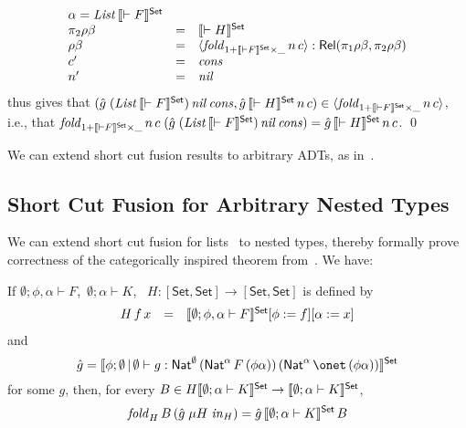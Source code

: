 \documentclass{lmcs}
\theoremstyle{plain}\newtheorem{satz}[thm]{Satz}
\newcommand{\set}{\mathsf{Set}}
\begin{document}
{\[\begin{array}{lll}
{  \alpha}=\mathit{List}\,\setsem{\vdash F}\\
\pi_2 \rho \beta & = & \setsem{\vdash H}\\
\rho \beta & = & \graph{\mathit{fold}_{1 + \setsem{\vdash F} \times \_}\, n\, c} :
\rel(\pi_1 \rho \beta, \pi_2 \rho \beta)\\
c' & = & \mathit{cons}\\
n' & = & \mathit{nil}
\end{array}\]
thus gives that $(\hat{g}\;(\mathit{List}\,\setsem{\vdash
  F})\,\mathit{nil} \,\mathit{cons}, \hat{g} \,\setsem{\vdash H} \,
n\, c) \in \graph{\mathit{fold}_{1 + \setsem{\vdash F} \times \_}\, n\, c}$, i.e.,
that $\mathit{fold}_{1 + \setsem{\vdash F} \times \_}\, n\, c\; (\hat{g}\;
(\mathit{List}\,\setsem{\vdash F})\, \mathit{nil}\, \mathit{cons})
= \hat{g}\,\setsem{\vdash H}\, n\, c$.
\qed

We can extend short cut fusion results to arbitrary ADTs, as
in~\cite{joh02,pit98}.

\subsection{Short Cut Fusion for Arbitrary Nested
  Types}\label{sec:short-cut-nested} 

We can extend short cut fusion for lists~\cite{glp93} to nested types,
thereby formally prove correctness of the categorically inspired
theorem from~\cite{jg10}.  We have:
\begin{thm}\label{thm:short-cut-nested}
If $\emptyset;\phi,\alpha \vdash F$, \,$\emptyset; \alpha
\vdash K$, \,
$H : [\set,\set] \to [\set,\set]$ is defined by
\[\begin{array}{lll}
H\,f\,x & = & \setsem{\emptyset; \phi, \alpha \vdash F}[\phi :=
  f][\alpha := x]\\
\end{array}\]
and 
\[\hat{g} = \setsem{\phi;\emptyset\,|\,\emptyset \vdash g :
\Nat^\emptyset\,(\Nat^\alpha\,F\,(\phi\alpha))\,(\Nat^\alpha\,\onet \,
(\phi\alpha))}\] for some $g$, then, for every $B \in H
\setsem{\emptyset;\alpha \vdash K} \rightarrow \setsem{\emptyset;
  \alpha \vdash K}$,
$$\mathit{fold}_{H}\, B \, (\hat{g}\; \mu H \; \mathit{in}_{H}) = \hat{g}
\,\setsem{\emptyset;\alpha \vdash K}\, B$$
\end{thm}

}
\end{document}
